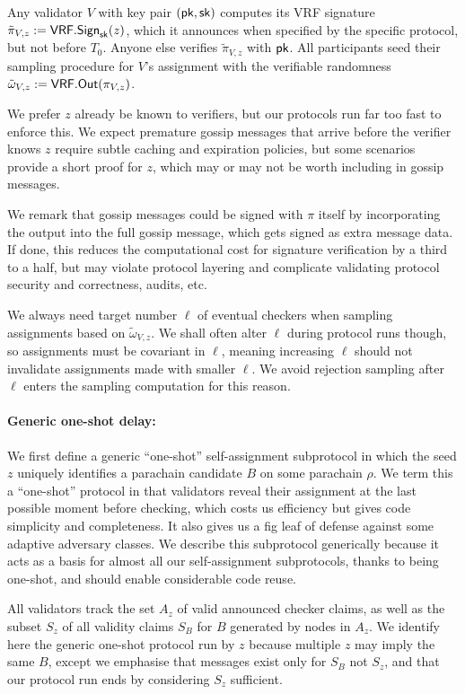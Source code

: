 Any validator $V$ with key pair $(\mathsf{pk},\mathsf{sk})$ computes its VRF signature $\tilde{\pi}_{V,z} := \mathsf{VRF}.\mathsf{Sign}_{\mathsf{sk}}(z)$, which it announces when specified by the specific protocol, but not before $T_0$.  Anyone else verifies $\tilde{\pi}_{V,z}$ with $\mathsf{pk}$.  All participants seed their sampling procedure for $V$'s assignment with the verifiable randomness $\tilde{\omega}_{V,z} := \mathsf{VRF}.\mathsf{Out}(\pi_{V,z})$.

We prefer $z$ already be known to verifiers, but our protocols run far too fast to enforce this.  We expect premature gossip messages that arrive before the verifier knows $z$ require subtle caching and expiration policies, but some scenarios provide a short proof for $z$, which may or may not be worth including in gossip messages.

We remark that gossip messages could be signed with $\pi$ itself by incorporating the output into the full gossip message, which gets signed as extra message data.  If done, this reduces the computational cost for signature verification by a third to a half, but may violate protocol layering and complicate validating protocol security and correctness, audits, etc. 

We always need target number $\ell$ of eventual checkers when sampling assignments based on $\tilde{\omega}_{V,z}$.  We shall often alter $\ell$ during protocol runs though, so assignments must be covariant in $\ell$, meaning increasing $\ell$ should not invalidate assignments made with smaller $\ell$.  We avoid rejection sampling after $\ell$ enters the sampling computation for this reason.

\paragraph{Generic one-shot delay:}

We first define a generic ``one-shot'' self-assignment subprotocol in which the seed $z$ uniquely identifies a parachain candidate $B$ on some parachain $\rho$.  We term this a ``one-shot'' protocol in that validators reveal their assignment at the last possible moment before checking, which costs us efficiency but gives code simplicity and completeness.  It also gives us a fig leaf of defense against some adaptive adversary classes.  We describe this subprotocol generically because it acts as a basis for almost all our self-assignment subprotocols, thanks to being one-shot, and should enable considerable code reuse.  

All validators track the set $A_z$ of valid announced checker claims, as well as the subset $S_z$ of all validity claims $S_B$ for $B$ generated by nodes in $A_z$.  We identify here the generic one-shot protocol run by $z$ because multiple $z$ may imply the same $B$, except we emphasise that messages exist only for $S_B$ not $S_z$, and that our protocol run ends by considering $S_z$ sufficient.  

